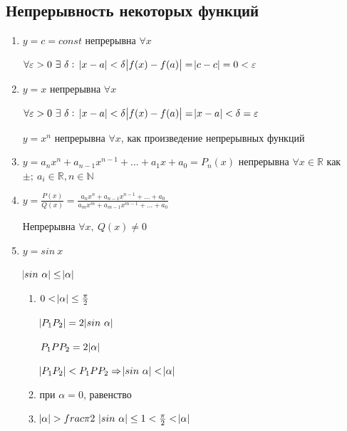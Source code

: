 \documentclass{article}
\begin{document}
    \subsection{Непрерывность некоторых функций}
    
    \begin{enumerate}
        \item \( y=c=const \) непрерывна \( \forall x \)
        
        \( \forall \varepsilon > 0\ \exists\ \delta:\ \abs{x - a} < \delta \abs{f(x) - f(a)} = \abs{c - c} = 0 < \varepsilon \)

        \item \(y=x\) непрерывна \(\forall x\)
        
        \(\forall \varepsilon > 0\ \exists\ \delta:\ \abs{x - a} < \delta \abs{f(x) - f(a)} = \abs{x - a} < \delta = \varepsilon\)
    
        \(y=x^n\) непрерывна \(\forall x\), как произведение непрерывных функций
        
        \item \(y = a_n x^n + a_{n-1}x^{n-1}+...+a_1x+a_0 = P_n(x)\) непрерывна \(\forall x \in \mathbb{R}\) как \(\pm;\ a_i \in \mathbb{R}, n \in \mathbb{N}\)
    
        \item \( y = \frac{P(x)}{Q(x)} = \frac{a_{n}x^{n} + a_{n - 1}x^{n - 1} + ... + a_0}{a_{m}x^{m} + a_{m - 1}x^{m - 1} + ... + a_0} \)
        
        Непрерывна \(\forall x,\ Q(x) \neq 0\)
            
        \item \(y = sin\ x\)

        \( \abs{sin\ \alpha} \leq \abs{\alpha} \)
        \begin{enumerate}
            \item \(0 < \abs{\alpha} \leq \frac{\pi}{2}\)

            \(\abs{P_1P_2}=2\abs{sin\ \alpha}\)

            \( P_1PP_2 = 2\abs{\alpha}\)
            
            \(\abs{P_1P_2}<P_1PP_2 \Rightarrow \abs{sin\ \alpha} < \abs{\alpha}\)

            \item при \( \alpha = 0 \), равенство
            \item \( \abs{\alpha} > frac{\pi}{2}\ \abs{sin\ \alpha} \leq 1 < \frac{\pi}{2} < \abs{\alpha} \)
            

\end{enumerate}
\end{enumerate}
\end{document}
